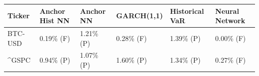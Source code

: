 \begin{tabular}{llllll}
\toprule
Ticker & Anchor Hist NN & Anchor NN & GARCH(1,1) & Historical VaR & Neural Network \\
\midrule
BTC-USD & 0.19\% (F) & 1.21\% (P) & 0.28\% (F) & 1.39\% (P) & 0.00\% (F) \\
\^{}GSPC & 0.94\% (P) & 1.07\% (P) & 1.60\% (P) & 1.34\% (P) & 0.27\% (F) \\
\bottomrule
\end{tabular}

